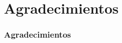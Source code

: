 \section{Agradecimientos}
\begin{frame}[t]
\frametitle{Agradecimientos}
\begin{itemize}

\end{itemize}
\end{frame}
